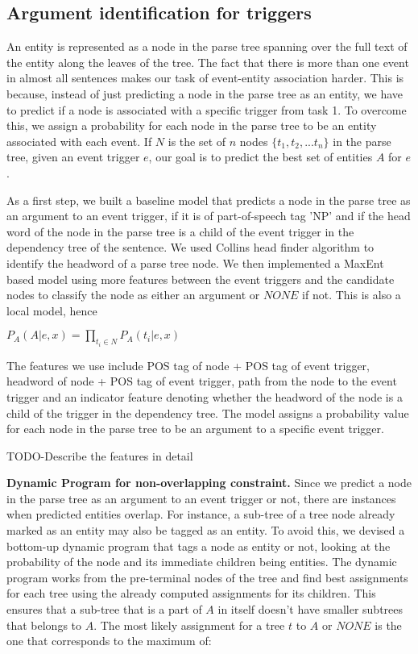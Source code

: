 \subsection{Argument identification for triggers}
An entity is represented as a node in the parse tree spanning over the full text of the entity along the leaves of the tree. The fact that there is more than one event in almost all sentences makes our task of event-entity association harder. This is because, instead of just predicting a node in the parse tree as an entity, we have to predict if a node is associated with a specific trigger from task 1. To overcome this, we assign a probability for each node in the parse tree to be an entity associated with each event. If $N$ is the set of $n$ nodes $\{t_1, t_2, ... t_n\}$ in the parse tree, given an event trigger $e$, our goal is to predict the best set of entities $A$ for $e$.

As a first step, we built a baseline model that predicts a node in the parse tree as an argument to an event trigger, if it is of part-of-speech tag 'NP' and if the head word of the node in the parse tree is a child of the event trigger in the dependency tree of the sentence. We used Collins head finder algorithm to identify the headword of a parse tree node. We then implemented a MaxEnt based model using more features between the event triggers and the candidate nodes to classify the node as either an argument or $NONE$ if not. This is also a local model, hence

$P_{A}(A | e, x) = \prod_{t_{i}\in N} P_{A}(t_{i} | e, x) $

The features we use include POS tag of node + POS tag of event trigger, headword of node + POS tag of event trigger, path from the node to the event trigger and an indicator feature denoting whether the headword of the node is a child of the trigger in the dependency tree. The model assigns a probability value for each node in the parse tree to be an argument to a specific event trigger.

TODO-Describe the features in detail

{\bf Dynamic Program for non-overlapping constraint.} Since we predict a node in the parse tree as an argument to an event trigger or not, there are instances when predicted entities overlap. For instance, a sub-tree of a tree node already marked as an entity may also be tagged as an entity. To avoid this, we devised a bottom-up dynamic program that tags a node as entity or not, looking at the probability of the node and its immediate children being entities. The dynamic program works from the pre-terminal nodes of the tree and find best assignments for each tree using the already computed assignments for its children. This ensures that a sub-tree that is a part of $A$ in itself doesn't have smaller subtrees that belongs to $A$. The most likely assignment for a tree $t$  to $A$ or $NONE$ is the one that corresponds to the maximum of:

